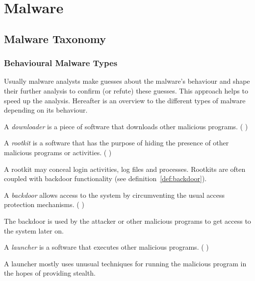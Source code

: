 \chapter{Malware} \label{chap:malware}

\section{Malware Taxonomy}

\subsection{Behavioural Malware Types}

Usually malware analysts make guesses about the malware's behaviour and shape their further analysis to confirm (or refute) these guesses. This approach helps to speed up the analysis. \cite[]{sikorski12} Hereafter is an overview to the different types of malware depending on its behaviour.

\begin{definition}[Downloader]
A \emph{downloader} is a piece of software that downloads other malicious programs. (\cf{} \cite[]{sikorski12})
\end{definition} 

\begin{definition}[Rootkit]
A \emph{rootkit} is a software that has the purpose of hiding the presence of other malicious programs or activities. (\cf{} \cite[]{sikorski12})
\end{definition} 

A rootkit may conceal login activities, log files and processes.
Rootkits are often coupled with backdoor functionality (see definition~\ref{def:backdoor}).

\begin{definition}[Backdoor]
A \emph{backdoor} allows access to the system by circumventing the usual access protection mechanisms. (\cf{} \cite[]{sikorski12}) \label{def:backdoor}
\end{definition} 

The backdoor is used by the attacker or other malicious programs to get access to the system later on.

\begin{definition}[Launcher]
A \emph{launcher} is a software that executes other malicious programs. (\cf{} \cite[]{sikorski12})
\end{definition} 

A launcher mostly uses unusual techniques for running the malicious program in the hopes of providing stealth.

